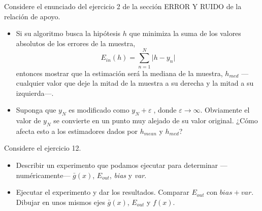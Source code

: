 \documentclass[a4paper, 11pt]{article}
\begin{document}
    \begin{bonus}
        Considere el enunciado del ejercicio 2 de la sección ERROR Y RUIDO de la relación de apoyo.
        \begin{itemize}
            \item Si su algoritmo busca la hipótesis $h$ que minimiza la suma de los valores absolutos de los errores de la muestra,
            \[
            E_{in}(h) = \sum_{n=1}^N \vert h - y_n \vert
            \]
            entonces mostrar que la estimación será la mediana de la muestra, $h_{med}$ ---cualquier valor que deje la mitad de la muestra a su derecha y la mitad a su izquierda---.
            \item Suponga que $y_N$ es modificado como $y_N + \varepsilon$, donde $\varepsilon \to \infty$. Obviamente el valor de $y_N$ se convierte en un punto muy alejado de su valor original. ¿Cómo afecta esto a los estimadores dados por $h_{mean}$ y $h_{med}$?
        \end{itemize}
    \end{bonus}



    \begin{bonus}
        Considere el ejercicio 12.
        \begin{itemize}
            \item Describir un experimento que podamos ejecutar para determinar ---numéricamente--- $\bar{g}(x)$, $E_{out}$, \emph{bias} y \emph{var}.
            \item Ejecutar el experimento y dar los resultados. Comparar $E_{out}$ con $bias+var$. Dibujar en unos mismos ejes $\bar{g}(x)$, $E_{out}$ y $f(x)$.
        \end{itemize}
    \end{bonus}

    \nocite{*}



\end{document}
